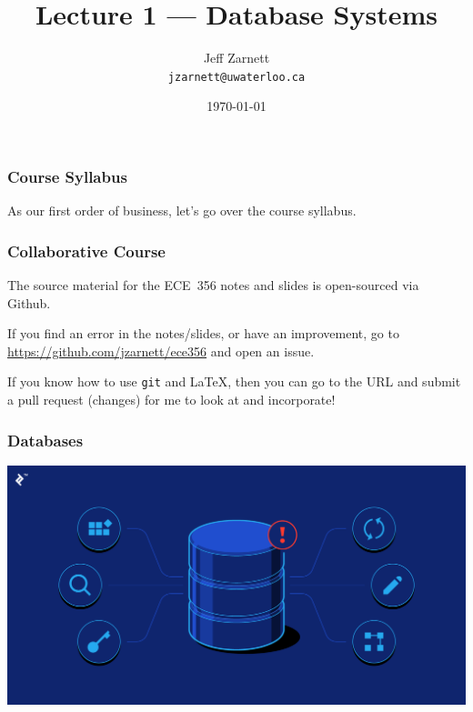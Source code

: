 

\title{Lecture 1 --- Database Systems}

\author{Jeff Zarnett \\ \small \texttt{jzarnett@uwaterloo.ca}}
\date{\today}




\begin{frame}
  \titlepage

 \end{frame}

\begin{frame}
\frametitle{Course Syllabus}

As our first order of business, let's go over the course syllabus.

\end{frame}

\begin{frame}
\frametitle{Collaborative Course}

The source material for the ECE~356 notes and slides is open-sourced via Github. 

If you find an error in the notes/slides, or have an improvement, go to \url{https://github.com/jzarnett/ece356} and open an issue. 

If you know how to use \texttt{git} and \LaTeX, then you can go to the URL and submit a pull request (changes) for me to look at and incorporate!


\end{frame}


\begin{frame}
\frametitle{Databases}

\begin{center}
	\includegraphics[width=\textwidth]{images/database-img.png}
\end{center}


\end{frame}


